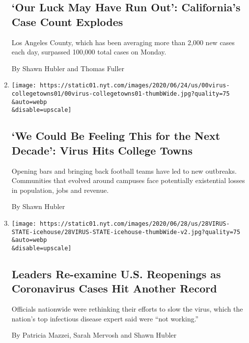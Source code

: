 \begin{enumerate}
  \hypertarget{our-luck-may-have-run-out-californias-case-count-explodes}{%
  \subsection{`Our Luck May Have Run Out': California's Case Count
  Explodes}\label{our-luck-may-have-run-out-californias-case-count-explodes}}

  Los Angeles County, which has been averaging more than 2,000 new cases
  each day, surpassed 100,000 total cases on Monday.

  By Shawn Hubler and Thomas Fuller
\item
  \href{/2020/06/28/us/coronavirus-college-towns.html}{}

  \texttt{[image: https://static01.nyt.com/images/2020/06/24/us/00virus-collegetowns01/00virus-collegetowns01-thumbWide.jpg?quality=75\\\&auto=webp\\\&disable=upscale]}

  \hypertarget{we-could-be-feeling-this-for-the-next-decade-virus-hits-college-towns}{%
  \subsection{`We Could Be Feeling This for the Next Decade': Virus Hits
  College
  Towns}\label{we-could-be-feeling-this-for-the-next-decade-virus-hits-college-towns}}

  Opening bars and bringing back football teams have led to new
  outbreaks. Communities that evolved around campuses face potentially
  existential losses in population, jobs and revenue.

  By Shawn Hubler
\item
  \href{/2020/06/26/us/coronavirus-florida-texas-bars-closing.html}{}

  \texttt{[image: https://static01.nyt.com/images/2020/06/28/us/28VIRUS-STATE-icehouse/28VIRUS-STATE-icehouse-thumbWide-v2.jpg?quality=75\\\&auto=webp\\\&disable=upscale]}

  \hypertarget{leaders-re-examine-us-reopenings-as-coronavirus-cases-hit-another-record}{%
  \subsection{Leaders Re-examine U.S. Reopenings as Coronavirus Cases
  Hit Another
  Record}\label{leaders-re-examine-us-reopenings-as-coronavirus-cases-hit-another-record}}

  Officials nationwide were rethinking their efforts to slow the virus,
  which the nation's top infectious disease expert said were ``not
  working.''

  By Patricia Mazzei, Sarah Mervosh and Shawn Hubler
\end{enumerate}


